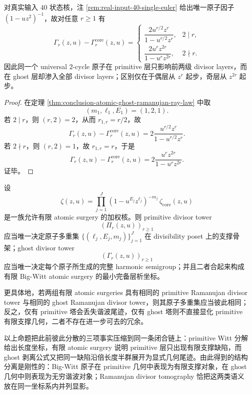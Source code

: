 \begin{corollary}\label{cor:conclusion-realinput40-ghost-ramanujan-parity-split}
对真实输入 \(40\) 状态核，注 \ref{rem:real-input-40-single-euler} 给出唯一原子因子 \((1-uz^2)^{-1}\)，故对任意 \(r\ge 1\) 有
\[
\Gamma_r(z,u)-\Gamma_r^{\mathrm{core}}(z,u)
=
\begin{cases}
\dfrac{2u^{r/2}z^r}{1-u^{r/2}z^r},& 2\mid r,\\[10pt]
\dfrac{2u^r z^{2r}}{1-u^r z^{2r}},& 2\nmid r.
\end{cases}
\]
因此同一个 universal \(2\)-cycle 原子在 primitive 层只影响前两级 divisor layers，而在 ghost 层却渗入全部 divisor layers；区别仅在于偶层从 \(z^r\) 起步，奇层从 \(z^{2r}\) 起步。
\end{corollary}
\begin{proof}
在定理 \ref{thm:conclusion-atomic-ghost-ramanujan-ray-law} 中取
\[
(m_1,\ell_1,E_1)=(1,2,1).
\]
若 \(2\mid r\)，则 \((r,2)=2\)，从而 \(r_{1,r}=r/2\)，故
\[
\Gamma_r(z,u)-\Gamma_r^{\mathrm{core}}(z,u)
=
2\frac{u^{r/2}z^r}{1-u^{r/2}z^r}.
\]
若 \(2\nmid r\)，则 \((r,2)=1\)，故 \(r_{1,r}=r\)，于是
\[
\Gamma_r(z,u)-\Gamma_r^{\mathrm{core}}(z,u)
=
2\frac{u^r z^{2r}}{1-u^r z^{2r}}.
\]
证毕。
\end{proof}

\begin{conjecture}\label{conj:conclusion-bigwitt-primitive-ghost-ramanujan-tomography}
设
\[
\zeta(z,u)=\prod_{j=1}^{J}(1-u^{E_j}z^{\ell_j})^{-m_j}\,\zeta_{\mathrm{core}}(z,u)
\]
是一族允许有限 atomic surgery 的加权核。则 primitive divisor tower
\[
(\Pi_r(z,u))_{r\ge 1}
\]
应当唯一决定原子多重集 \(\{(\ell_j,E_j,m_j)\}_{j=1}^{J}\) 在 divisibility poset 上的支撑骨架；ghost divisor tower
\[
(\Gamma_r(z,u))_{r\ge 1}
\]
应当唯一决定每个原子所生成的完整 harmonic semigroup；并且二者合起来构成有限 Big-Witt atomic surgery 的最小完备层析坐标。

更具体地，若两组有限 atomic surgeries 具有相同的 primitive Ramanujan divisor tower 与相同的 ghost Ramanujan divisor tower，则其原子多重集应当彼此相同；反之，仅有 primitive 塔会丢失谐波尾迹，仅有 ghost 塔则不直接显化 primitive 有限支撑几何，二者不存在进一步可去的冗余。
\end{conjecture}

以上命题把此前彼此分散的三项事实压缩到同一条闭合链上：primitive Witt 分解给出长度坐标，有限 atomic surgery 说明 primitive 层只出现有限支撑缺陷，而 ghost 剥离公式又把同一缺陷沿倍长度半群展开为显式几何尾迹。由此得到的结构分离是刚性的：Big-Witt 原子在 primitive 几何中表现为有限支撑对象，在 ghost 几何中则表现为无穷谐波对象；Ramanujan divisor tomography 恰把这两类语义放在同一坐标系内并列显影。
